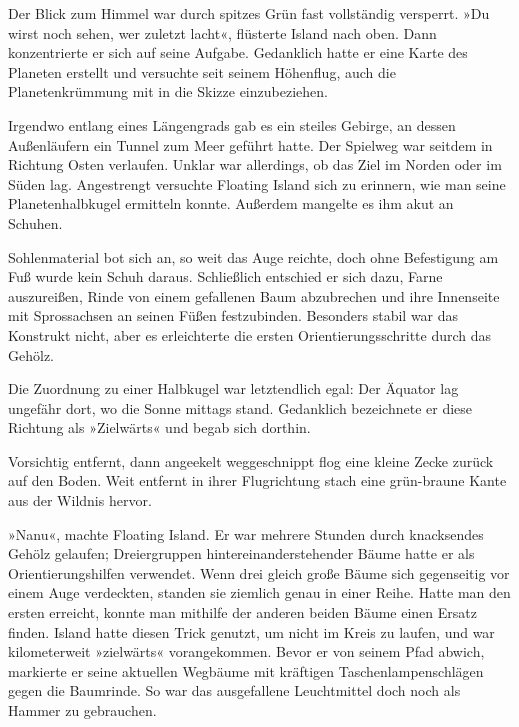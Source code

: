 Der Blick zum Himmel war durch spitzes Grün fast vollständig versperrt. »Du wirst noch sehen, wer zuletzt lacht«, flüsterte Island nach oben. Dann konzentrierte er sich auf seine Aufgabe. Gedanklich hatte er eine Karte des Planeten erstellt und versuchte seit seinem Höhenflug, auch die Planetenkrümmung mit in die Skizze einzubeziehen.

Irgendwo entlang eines Längengrads gab es ein steiles Gebirge, an dessen Außenläufern ein Tunnel zum Meer geführt hatte. Der Spielweg war seitdem in Richtung Osten verlaufen. Unklar war allerdings, ob das Ziel im Norden oder im Süden lag. Angestrengt versuchte Floating Island sich zu erinnern, wie man seine Planetenhalbkugel ermitteln konnte. Außerdem mangelte es ihm akut an Schuhen.

Sohlenmaterial bot sich an, so weit das Auge reichte, doch ohne Befestigung am Fuß wurde kein Schuh daraus. Schließlich entschied er sich dazu, Farne auszureißen, Rinde von einem gefallenen Baum abzubrechen und ihre Innenseite mit Sprossachsen an seinen Füßen festzubinden. Besonders stabil war das Konstrukt nicht, aber es erleichterte die ersten Orientierungsschritte durch das Gehölz.

Die Zuordnung zu einer Halbkugel war letztendlich egal: Der Äquator lag ungefähr dort, wo die Sonne mittags stand. Gedanklich bezeichnete er diese Richtung als »Zielwärts« und begab sich dorthin.

\cleardoubleevenpage



Vorsichtig entfernt, dann angeekelt weggeschnippt flog eine kleine Zecke zurück auf den Boden. Weit entfernt in ihrer Flugrichtung stach eine grün-braune Kante aus der Wildnis hervor.

»Nanu«, machte Floating Island. Er war mehrere Stunden durch knacksendes Gehölz gelaufen; Dreiergruppen hintereinanderstehender Bäume hatte er als Orientierungshilfen verwendet. Wenn drei gleich große Bäume sich gegenseitig vor einem Auge verdeckten, standen sie ziemlich genau in einer Reihe. Hatte man den ersten erreicht, konnte man mithilfe der anderen beiden Bäume einen Ersatz finden. Island hatte diesen Trick genutzt, um nicht im Kreis zu laufen, und war kilometerweit »zielwärts« vorangekommen. Bevor er von seinem Pfad abwich, markierte er seine aktuellen Wegbäume mit kräftigen Taschenlampenschlägen gegen die Baumrinde. So war das ausgefallene Leuchtmittel doch noch als Hammer zu gebrauchen.

